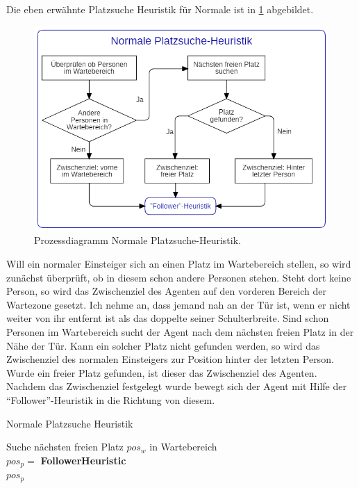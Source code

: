 Die eben erwähnte Platzsuche Heuristik für Normale ist in \figurename \ref{fig:NPH} abgebildet.
\begin{figure}[H]
	\centering
		\includegraphics[width=1.0\textwidth]{pictures/model/algorithm/boarding/normal_boarding/normal_space_find_heuristic.png}
	\caption{Prozessdiagramm Normale Platzsuche-Heuristik.}
	\label{fig:NPH}
\end{figure}
Will ein normaler Einsteiger sich an einen Platz im Wartebereich stellen, so wird zunächst überprüft, ob in diesem schon andere Personen stehen. Steht dort keine Person, so wird das Zwischenziel des Agenten auf den vorderen Bereich der Wartezone gesetzt. Ich nehme an, dass jemand nah an der Tür ist, wenn er nicht weiter von ihr entfernt ist als das doppelte seiner Schulterbreite. Sind schon Personen im Wartebereich sucht der Agent nach dem nächsten freien Platz in der Nähe der Tür. Kann ein solcher Platz nicht gefunden werden, so wird das Zwischenziel des normalen Einsteigers zur Position hinter der letzten Person. Wurde ein freier Platz gefunden, ist dieser das Zwischenziel des Agenten. Nachdem das Zwischenziel festgelegt wurde bewegt sich der Agent mit Hilfe der "`Follower"'-Heuristik in die Richtung von diesem.

\begin{algorithm} [H]
	\caption{Normale Platzsuche Heuristik}
	
	\normalSpaceFindHeuristic{} {
		 {
			Suche nächsten freien Platz $pos_w$ in Wartebereich \\
		} 
		$pos_p = $ \textbf{FollowerHeuristic} \\
		\Return $pos_p$
	}
\end{algorithm}

